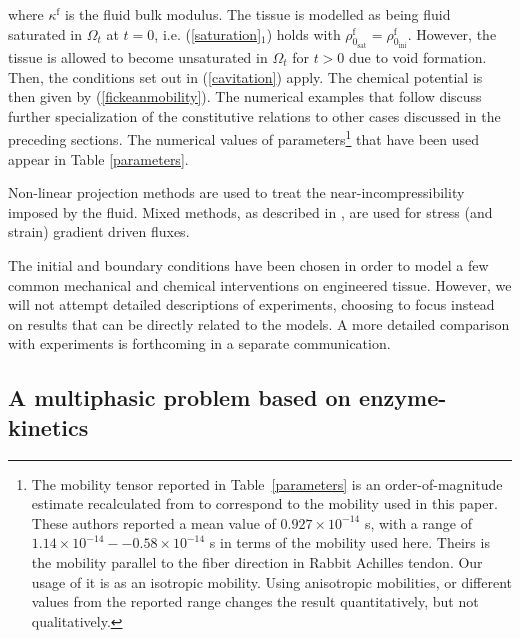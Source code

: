 \noindent where $\kappa^\mathrm{f}$ is the fluid bulk modulus. The
tissue is modelled as being fluid saturated in $\Omega_t$ at $t = 0$,
i.e. (\ref{saturation}$_1$) holds with
$\rho^\mathrm{f}_{0_\mathrm{sat}} =
\rho^\mathrm{f}_{0_\mathrm{ini}}$. However, the tissue is allowed to 
become unsaturated in $\Omega_t$ for $t > 0$ due to void formation. Then,
the conditions set out in (\ref{cavitation})
apply. The chemical potential is then given by
(\ref{fickeanmobility}). The numerical examples that follow discuss further
specialization of the constitutive relations to other cases discussed
in the preceding sections. The numerical values of parameters\footnote{The
  mobility tensor reported in Table~\ref{parameters} is an
  order-of-magnitude estimate 
  recalculated from \citet{Hanetal:2000} to correspond to the 
  mobility used in this paper. These authors reported a mean value of
  $0.927\times 10^{-14}$ s, with a range of $1.14\times
  10^{-14}--0.58\times 10^{-14}$ s in terms of the mobility used
  here. Theirs is the mobility parallel to the fiber direction in
  Rabbit Achilles tendon. Our usage of it is as an isotropic
  mobility. Using anisotropic mobilities, or different values from the
  reported range changes the result
  quantitatively, but not qualitatively.}  that
have been used appear in Table \ref{parameters}.


Non-linear projection methods \citep{simotaylorpister:85} are used to treat the
near-incompressibility imposed by the fluid. Mixed methods, as described
in \cite{Garikipatiox2:01}, are used for stress (and strain) gradient
driven fluxes.

The initial and boundary
conditions have been chosen in order to model a few common mechanical and
chemical interventions on engineered tissue. However, we will not
attempt detailed descriptions of experiments, choosing to focus
instead on results that can be directly related to the models. A more
detailed comparison with experiments is forthcoming in a separate
communication. 

\subsection{A multiphasic problem based on enzyme-kinetics}
\label{enzyme_kinetics_eg}

